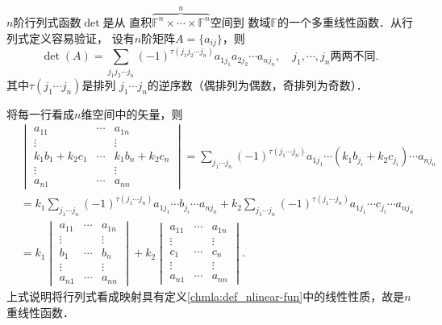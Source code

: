 \begin{example}\label{chmla:exm_det}
	$n$阶行列式函数$\det$是从 
	直积$\overbrace{\mathbb{F}^n \times \cdots \times \mathbb{F}^n}^n$空间到
	数域$\mathbb{F}$的一个多重线性函数．从行列式定义容易验证，
	设有$n$阶矩阵$A=\{a_{ij}\}$，则
	\begin{equation}\label{chmla:eqn_det}
		\det (A)  = \sum_{j_1 j_2\cdots j_n} (-1)^{\tau(j_1 j_2 \cdots j_n)}
		a_{1 j_1} a_{2 j_2}\cdots a_{n j_n} , \quad
		j_1,\cdots,j_n \text{两两不同}.
	\end{equation}
	其中$\tau(j_1 \cdots j_n)$是排列 $j_1\cdots j_n$的逆序数（偶排列为偶数，奇排列为奇数）．
	
	将每一行看成$n$维空间中的矢量，则
	\begin{align*}
		&\begin{vmatrix}
			a_{11} & \cdots & a_{1n} \\
			\vdots &    & \vdots \\
			k_1 b_1 + k_2 c_1 &\cdots & k_1 b_n + k_2 c_n \\
			\vdots &    & \vdots \\
			a_{n1} & \cdots & a_{nn}
		\end{vmatrix}
		= \sum_{j_1 \cdots j_n} (-1)^{\tau(j_1 \cdots j_n)}
		a_{1 j_1} \cdots (k_1 b_{j_i} + k_2 c_{j_i}) \cdots a_{n j_n}  \\
		&= k_1 \sum_{j_1 \cdots j_n} (-1)^{\tau(j_1 \cdots j_n)}
		a_{1 j_1} \cdots b_{j_i} \cdots a_{n j_n}
		+ k_2 \sum_{j_1 \cdots j_n} (-1)^{\tau(j_1 \cdots j_n)}
		a_{1 j_1} \cdots c_{j_i} \cdots a_{n j_n}  \\
		&=k_1 \begin{vmatrix}
			a_{11} & \cdots & a_{1n} \\
			\vdots &    & \vdots \\
			b_1 &\cdots & b_n \\
			\vdots &    & \vdots \\
			a_{n1} & \cdots & a_{nn}
		\end{vmatrix} +
		k_2 \begin{vmatrix}
			a_{11} & \cdots & a_{1n} \\
			\vdots &    & \vdots \\
			c_1 &\cdots & c_n \\
			\vdots &    & \vdots \\
			a_{n1} & \cdots & a_{nn}
		\end{vmatrix} .
	\end{align*}
	上式说明将行列式看成映射具有定义\ref{chmla:def_nlinear-fun}中的线性性质，故是$n$重线性函数．
\end{example}

